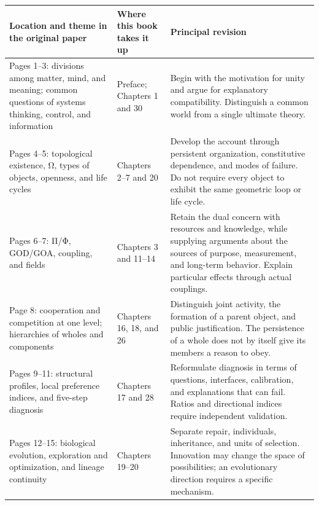 \documentclass[
  english,
  11pt,
  oneside]{book}
\newcounter{none} %
\begin{document}
{\def\LTcaptype{none} %
\begin{longtable}[]{@{}
  >{\raggedright\arraybackslash}p{}
  >{\raggedright\arraybackslash}p{}
  >{\raggedright\arraybackslash}p{}@{}}
\toprule\noalign{}
\begin{minipage}[b]{\linewidth}\raggedright
Location and theme in the original paper
\end{minipage} & \begin{minipage}[b]{\linewidth}\raggedright
Where this book takes it up
\end{minipage} & \begin{minipage}[b]{\linewidth}\raggedright
Principal revision
\end{minipage} \\
\midrule\noalign{}
\endhead
\bottomrule\noalign{}
\endlastfoot
Pages 1--3: divisions among matter, mind, and meaning; common questions of systems thinking, control, and information & Preface; Chapters 1 and 30 & Begin with the motivation for unity and argue for explanatory compatibility. Distinguish a common world from a single ultimate theory. \\
Pages 4--5: topological existence, Ω, types of objects, openness, and life cycles & Chapters 2--7 and 20 & Develop the account through persistent organization, constitutive dependence, and modes of failure. Do not require every object to exhibit the same geometric loop or life cycle. \\
Pages 6--7: Π/Φ, GOD/GOA, coupling, and fields & Chapters 3 and 11--14 & Retain the dual concern with resources and knowledge, while supplying arguments about the sources of purpose, measurement, and long-term behavior. Explain particular effects through actual couplings. \\
Page 8: cooperation and competition at one level; hierarchies of wholes and components & Chapters 16, 18, and 26 & Distinguish joint activity, the formation of a parent object, and public justification. The persistence of a whole does not by itself give its members a reason to obey. \\
Pages 9--11: structural profiles, local preference indices, and five-step diagnosis & Chapters 17 and 28 & Reformulate diagnosis in terms of questions, interfaces, calibration, and explanations that can fail. Ratios and directional indices require independent validation. \\
Pages 12--15: biological evolution, exploration and optimization, and lineage continuity & Chapters 19--20 & Separate repair, individuals, inheritance, and units of selection. Innovation may change the space of possibilities; an evolutionary direction requires a specific mechanism. \\

\end{longtable}}
\end{document}
